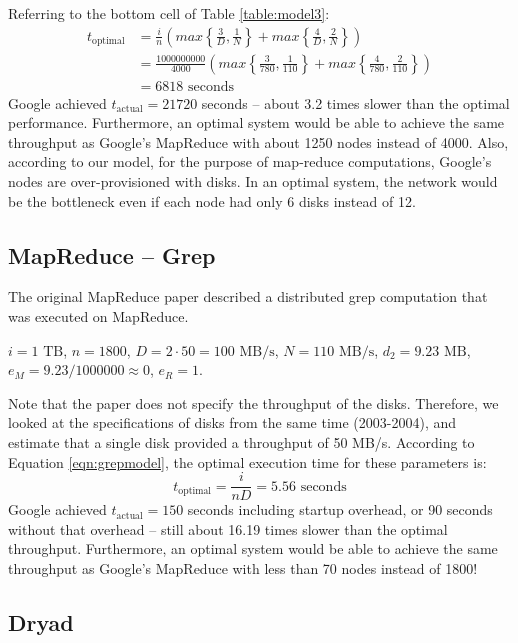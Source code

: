 \documentclass{acm_proc_article-sp}
\begin{document}
Referring to the bottom cell of Table \ref{table:model3}:
\begin{align*}
t_\text{optimal}
  &= \frac{i}{n} \left( max\left\{\frac{3}{D},
\frac{1}{N}\right\} + max\left\{\frac{4}{D}, \frac{2}{N}\right\} \right)\\ 
  &= \frac{1000000000}{4000} \left( max\left\{\frac{3}{780},
 \frac{1}{110}\right\} + max\left\{\frac{4}{780}, \frac{2}{110}\right\}
 \right)\\ &= 6818 \text{ seconds} 
\end{align*}
Google achieved $t_\text{actual} = 21720$ seconds -- about 3.2 times slower than
the optimal performance. Furthermore, an optimal system would be able to
achieve the same throughput as Google's MapReduce with about 1250 nodes instead
of 4000. Also, according to our model, for the purpose of map-reduce
computations, Google's nodes are over-provisioned with disks. In an optimal
system, the network would be the bottleneck even if each node had only 6
disks instead of 12.

\subsection{MapReduce -- Grep}

The original MapReduce paper \cite{mapreduce} described a distributed grep
computation that was executed on MapReduce.

$i = 1 \text{ TB}$, $n = 1800$, $D = 2 \cdot 50 = 100 \text{ MB/s}$, $N = 110
\text{ MB/s}$, $d_2 = 9.23 \text{ MB}$, $e_M = 9.23/1000000 \approx 0$, $e_R =
1$.

Note that the paper does not specify the throughput of the disks. Therefore, we
looked at the specifications of disks from the same time (2003-2004), and
estimate that a single disk provided a throughput of 50 MB/s. According to
Equation \ref{eqn:grepmodel}, the optimal execution time for these parameters
is:
\[t_\text{optimal} = \frac{i}{n D} = 5.56 \text{ seconds}\]
Google achieved $t_\text{actual} = 150$ seconds including startup overhead, or
90 seconds without that overhead -- still about 16.19 times slower than the
optimal throughput. Furthermore, an optimal system would be able to achieve the
same throughput as Google's MapReduce with less than 70 nodes instead of 1800!

\subsection{Dryad}
\end{document}
